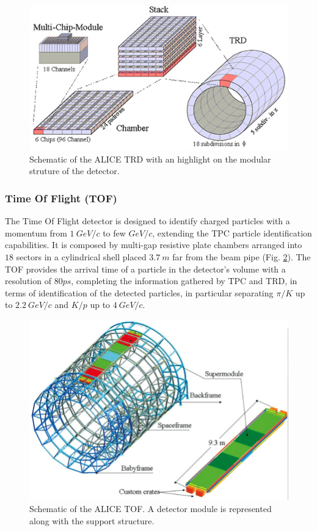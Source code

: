 \begin{figure}[!h]
\begin{center}
\includegraphics[width=0.7\linewidth]{Chapters/Introduction/Figs/trd.jpg}
\caption{Schematic of the ALICE TRD with an highlight on the modular struture of the detector.}
\label{fig:TRD}
\end{center}
\end{figure}

\subsubsection{Time Of Flight (TOF)}
The Time Of Flight detector is designed to identify charged particles with a momentum from $1\ GeV/c$ to few $GeV/c$, extending the TPC particle identification capabilities. 
It is composed by multi-gap resistive plate chambers arranged into $18$ sectors in a cylindrical shell placed $3.7\ m$ far from the beam pipe (Fig. \ref{fig:TOF}). 
The TOF provides the arrival time of a particle in the detector’s volume with a resolution of $80 ps$, completing the information gathered by TPC and TRD, in terms of identification of the detected particles, in particular separating $\pi/K$ up to $2.2\ GeV/c$ and $K/p$ up to $4\ GeV/c$.

\begin{figure}[!h]
\begin{center}
\includegraphics[width=0.7\linewidth]{Chapters/Introduction/Figs/tof.png}
\caption{Schematic of the ALICE TOF. A detector module is represented along with the support structure.}
\label{fig:TOF}
\end{center}
\end{figure}

